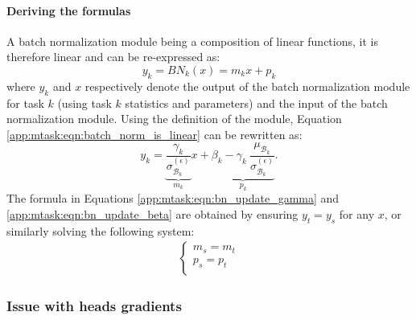 \paragraph{Deriving the formulas} A batch normalization module being a composition of linear functions, it is therefore linear and can be re-expressed as:
\begin{equation} \label{app:mtask:eqn:batch_norm_is_linear}
y_k = BN_k(x) = m_k x + p_k
\end{equation}
where $y_k$ and $x$ respectively denote the output of the batch normalization module for task $k$ (\ie using task $k$ statistics and parameters) and the input of the batch normalization module. Using the definition of the module, Equation \ref{app:mtask:eqn:batch_norm_is_linear} can be rewritten as:
\begin{equation} \label{app:mtask:eqn:batch_norm_is_linear_rewritten}
y_k = \underbrace{\dfrac{\gamma_k}{\sigma^{(\epsilon)}_{\mathcal{B}_k}}}_{m_k} x + \underbrace{\beta_k - \gamma_k\ \dfrac{\mu_{\mathcal{B}_k}}{\sigma^{(\epsilon)}_{\mathcal{B}_k}}}_{p_k}.
\end{equation}
The formula in Equations \ref{app:mtask:eqn:bn_update_gamma} and \ref{app:mtask:eqn:bn_update_beta} are obtained by ensuring $y_t = y_s$ for any $x$, or similarly solving the following system:
\begin{align}
\begin{cases}
m_s = m_t\\
p_s = p_t\\
\end{cases}
\end{align}

\subsubsection{Issue with heads gradients}
\label{sssec:mtask:gradientissue}

